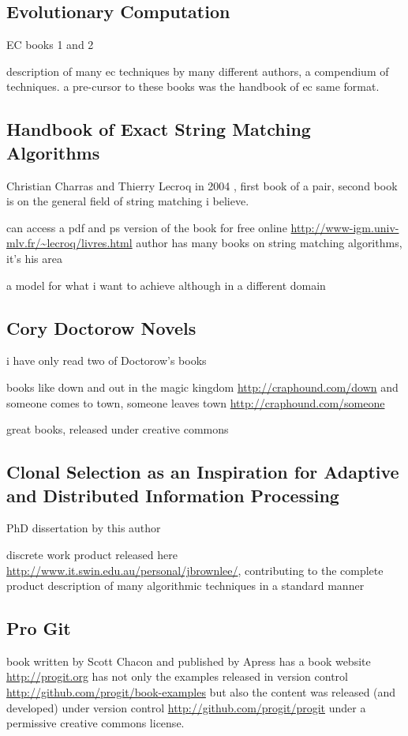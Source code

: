 \documentclass[a4paper, 11pt]{article}
\begin{document}
\subsection{Evolutionary Computation}

EC books 1 \cite{Baeck2000} and 2 \cite{Baeck2000a}

description of many ec techniques by many different authors, a compendium of techniques. a pre-cursor to these books was the handbook of ec \cite{Baeck1997} same format.


\subsection{Handbook of Exact String Matching Algorithms}
Christian Charras and Thierry Lecroq in 2004 \cite{Charras2004}, first book of a pair, second book is on the general field of string matching i believe.

can access a pdf and ps version of the book for free online \url{http://www-igm.univ-mlv.fr/~lecroq/livres.html}
author has many books on string matching algorithms, it's his area 

a model for what i want to achieve although in a different domain


\subsection{Cory Doctorow Novels}
i have only read two of Doctorow's books

books like down and out in the magic kingdom \cite{Doctorow2003} \url{http://craphound.com/down}
and someone comes to town, someone leaves town \cite{Doctorow2006} \url{http://craphound.com/someone}

great books, released under creative commons


\subsection{Clonal Selection as an Inspiration for Adaptive and Distributed Information Processing}

PhD dissertation by this author \cite{Brownlee2008}

discrete work product released here \url{http://www.it.swin.edu.au/personal/jbrownlee/}, contributing to the complete product 
description of many algorithmic techniques in a standard manner


\subsection{Pro Git}
book written by Scott Chacon and published by Apress \cite{Chacon2009}
has a book website \url{http://progit.org}
has not only the examples released in version control \url{http://github.com/progit/book-examples} but also the content was released (and developed) under version control \url{http://github.com/progit/progit} under a permissive creative commons license. 
\end{document}
